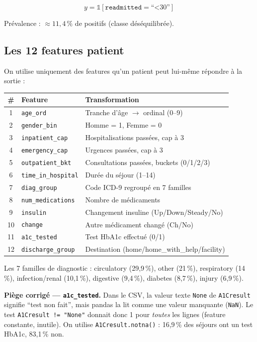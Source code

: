 \documentclass[11pt,a4paper]{article}
\begin{document}
$$y = \mathbb{1}[\texttt{readmitted} = \text{``<30''}]$$

Pr\'evalence : $\approx 11{,}4\,\%$ de positifs (classe d\'es\'equilibr\'ee).

\subsection{Les 12 features patient}

On utilise uniquement des features qu'un patient peut lui-m\^eme r\'epondre \`a la sortie :

\begin{center}
\small
\begin{tabularx}{\textwidth}{@{}clX@{}}
\toprule
\# & \textbf{Feature} & \textbf{Transformation} \\
\midrule
1 & \texttt{age\_ord} & Tranche d'\^age $\to$ ordinal (0--9) \\
2 & \texttt{gender\_bin} & Homme = 1, Femme = 0 \\
3 & \texttt{inpatient\_cap} & Hospitalisations pass\'ees, cap \`a 3 \\
4 & \texttt{emergency\_cap} & Urgences pass\'ees, cap \`a 3 \\
5 & \texttt{outpatient\_bkt} & Consultations pass\'ees, buckets (0/1/2/3) \\
6 & \texttt{time\_in\_hospital} & Dur\'ee du s\'ejour (1--14) \\
7 & \texttt{diag\_group} & Code ICD-9 regroup\'e en 7 familles \\
8 & \texttt{num\_medications} & Nombre de m\'edicaments \\
9 & \texttt{insulin} & Changement insuline (Up/Down/Steady/No) \\
10 & \texttt{change} & Autre m\'edicament chang\'e (Ch/No) \\
11 & \texttt{a1c\_tested} & Test HbA1c effectu\'e (0/1) \\
12 & \texttt{discharge\_group} & Destination (home/home\_with\_help/facility) \\
\bottomrule
\end{tabularx}
\end{center}

Les 7 familles de diagnostic : circulatory (29{,}9\,\%), other (21\,\%), respiratory (14\,\%), infection/renal (10{,}1\,\%), digestive (9{,}4\,\%), diabetes (8{,}7\,\%), injury (6{,}9\,\%).

\textbf{Pi\`ege corrig\'e --- \texttt{a1c\_tested}.} Dans le CSV, la valeur texte \texttt{None} de \texttt{A1Cresult} signifie ``test non fait'', mais pandas la lit comme une valeur manquante (\texttt{NaN}). Le test \texttt{A1Cresult != "None"} donnait donc 1 pour \emph{toutes} les lignes (feature constante, inutile). On utilise \texttt{A1Cresult.notna()} : 16{,}9\,\% des s\'ejours ont un test HbA1c, 83{,}1\,\% non.
\end{document}
